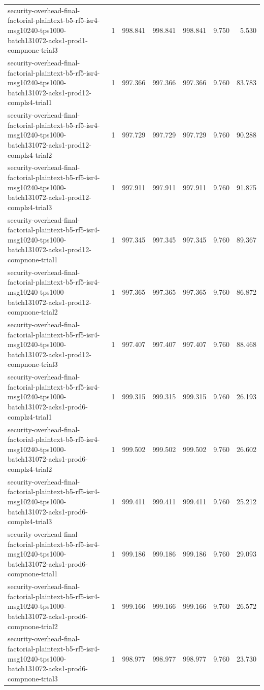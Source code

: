 \begin{tabular}{lrrrrrr}
security-overhead-final-factorial-plaintext-b5-rf5-isr4-msg10240-tps1000-batch131072-acks1-prod1-compnone-trial3 & 1 & 998.841 & 998.841 & 998.841 & 9.750 & 5.530 \\
security-overhead-final-factorial-plaintext-b5-rf5-isr4-msg10240-tps1000-batch131072-acks1-prod12-complz4-trial1 & 1 & 997.366 & 997.366 & 997.366 & 9.760 & 83.783 \\
security-overhead-final-factorial-plaintext-b5-rf5-isr4-msg10240-tps1000-batch131072-acks1-prod12-complz4-trial2 & 1 & 997.729 & 997.729 & 997.729 & 9.760 & 90.288 \\
security-overhead-final-factorial-plaintext-b5-rf5-isr4-msg10240-tps1000-batch131072-acks1-prod12-complz4-trial3 & 1 & 997.911 & 997.911 & 997.911 & 9.760 & 91.875 \\
security-overhead-final-factorial-plaintext-b5-rf5-isr4-msg10240-tps1000-batch131072-acks1-prod12-compnone-trial1 & 1 & 997.345 & 997.345 & 997.345 & 9.760 & 89.367 \\
security-overhead-final-factorial-plaintext-b5-rf5-isr4-msg10240-tps1000-batch131072-acks1-prod12-compnone-trial2 & 1 & 997.365 & 997.365 & 997.365 & 9.760 & 86.872 \\
security-overhead-final-factorial-plaintext-b5-rf5-isr4-msg10240-tps1000-batch131072-acks1-prod12-compnone-trial3 & 1 & 997.407 & 997.407 & 997.407 & 9.760 & 88.468 \\
security-overhead-final-factorial-plaintext-b5-rf5-isr4-msg10240-tps1000-batch131072-acks1-prod6-complz4-trial1 & 1 & 999.315 & 999.315 & 999.315 & 9.760 & 26.193 \\
security-overhead-final-factorial-plaintext-b5-rf5-isr4-msg10240-tps1000-batch131072-acks1-prod6-complz4-trial2 & 1 & 999.502 & 999.502 & 999.502 & 9.760 & 26.602 \\
security-overhead-final-factorial-plaintext-b5-rf5-isr4-msg10240-tps1000-batch131072-acks1-prod6-complz4-trial3 & 1 & 999.411 & 999.411 & 999.411 & 9.760 & 25.212 \\
security-overhead-final-factorial-plaintext-b5-rf5-isr4-msg10240-tps1000-batch131072-acks1-prod6-compnone-trial1 & 1 & 999.186 & 999.186 & 999.186 & 9.760 & 29.093 \\
security-overhead-final-factorial-plaintext-b5-rf5-isr4-msg10240-tps1000-batch131072-acks1-prod6-compnone-trial2 & 1 & 999.166 & 999.166 & 999.166 & 9.760 & 26.572 \\
security-overhead-final-factorial-plaintext-b5-rf5-isr4-msg10240-tps1000-batch131072-acks1-prod6-compnone-trial3 & 1 & 998.977 & 998.977 & 998.977 & 9.760 & 23.730 \\

\end{tabular}
